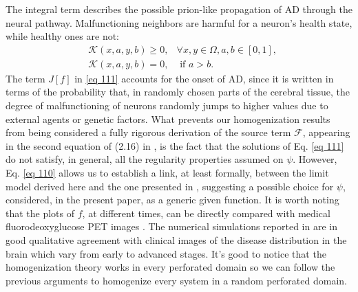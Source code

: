 The integral term describes the possible prion-like propagation of AD through the neural pathway. Malfunctioning neighbors are harmful for a neuron's health state, while healthy ones are not:
\begin{align*}
&\mathcal{K}(x, a, y, b) \geq 0, & \forall x, y \in \Omega, a, b \in[0,1], \\
&\mathcal{K}(x, a, y, b)=0, & \text { if } a>b .
\end{align*}
The term $J[f]$ in \eqref{eq 111} accounts for the onset of AD, since it is written in terms of the probability that, in randomly chosen parts of the cerebral tissue, the degree of malfunctioning of neurons randomly jumps to higher values due to external agents or genetic factors. What prevents our homogenization results from being considered a fully rigorous derivation of the source term $\mathcal{F}$, appearing in the second equation of (2.16) in \cite{Bertsch}, is the fact that the solutions of Eq. \eqref{eq 111} do not satisfy, in general, all the regularity properties assumed on $\psi$. However, Eq. \eqref{eq 110} allows us to establish a link, at least formally, between the limit model derived here and the one presented in \cite{Bertsch}, suggesting a possible choice for $\psi$, considered, in the present paper, as a generic given function.
It is worth noting that the plots of $f$, at different times, can be directly compared with medical fluorodeoxyglucose PET images \cite{Bertsch}. The numerical simulations reported in \cite{Bertsch} are in good qualitative agreement with clinical images of the disease distribution in the brain which vary from early to advanced stages.
It's good to notice that the homogenization theory works in every perforated domain so we can follow the previous arguments to homogenize every system in a random perforated domain.